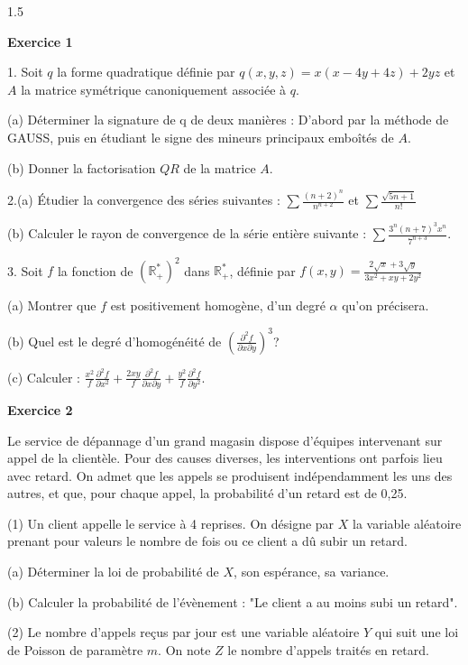 \documentclass[12pt]{article}
\begin{document}
\begin{spacing}{1.5}

\medskip\textbf{Exercice 1}

1. Soit $q$ la forme quadratique définie par $q(x,y,z) = x(x-4y + 4z) +2yz$ et $A$ la matrice symétrique canoniquement associée à $q$.

(a) Déterminer la signature de q de deux manières :
 D'abord par la méthode de GAUSS, puis en étudiant le signe des mineurs principaux emboîtés de $A$.

(b) Donner la factorisation $QR$ de la matrice $A$.

2.(a) Étudier la convergence des séries suivantes : $\sum\frac{(n+2)^n}{n^{n+2}}$ et $\sum\frac{\sqrt{5n+1}}{n!}$

 (b) Calculer le rayon de convergence de la série entière suivante : $\sum \frac{3^n(n+7)^3x^n}{7^{n+3}}$.
 
3. Soit $f$ la fonction de $(\mathbb{R}_{+}^{*})^2$ dans $\mathbb{R}_{+}^{*}$, définie par $f(x,y)=\frac{2\sqrt{x}+3\sqrt{y}}{3x^2+xy+2y^2}$

 (a) Montrer que $f$ est positivement homogène, d'un degré $\alpha$ qu'on précisera.
 
 (b) Quel est le degré d'homogénéité de $(\frac{\partial^2f}{\partial x\partial y})^3$?
 
 (c) Calculer : $\frac{x^2}{f}\frac{\partial^2f}{\partial x^2}+\frac{2xy}{f}\frac{\partial^2f}{\partial x\partial y}+\frac{y^2}{f}\frac{\partial^2f}{\partial y^2}$.
 
\medskip\textbf{Exercice 2}

 Le service de dépannage d'un grand magasin dispose d'équipes intervenant sur appel de la clientèle. Pour des causes diverses, les interventions ont parfois lieu avec retard. On admet que les appels se produisent indépendamment les uns des autres, et que, pour chaque appel, la probabilité d'un retard est de 0,25.
 
 (1) Un client appelle le service à 4 reprises. On désigne par $X$ la variable aléatoire prenant pour valeurs le nombre de fois ou ce client a dû subir un retard.
 
 (a) Déterminer la loi de probabilité de $X$, son espérance, sa variance.
 
 (b) Calculer la probabilité de l'évènement : "Le client a au moins subi un retard".
 
 (2) Le nombre d'appels reçus par jour est une variable aléatoire $Y$ qui suit une loi de
 Poisson de paramètre $m$. On note $Z$ le nombre d'appels traités en retard.
 

\end{spacing}
\end{document}
